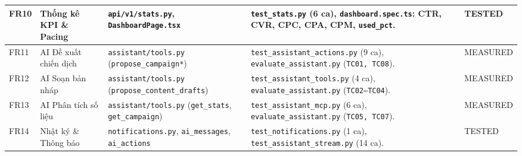 \begin{table}[!htbp]
\begin{tabularx}{\textwidth}{|C{0.9cm}|L{2.5cm}|L{3.5cm}|Y|C{1.9cm}|}
\hline
FR10 & Thống kê KPI \& Pacing & \texttt{api/v1/stats.py}, \texttt{DashboardPage.tsx} & \texttt{test\_stats.py} (6 ca), \texttt{dashboard.spec.ts}: CTR, CVR, CPC, CPA, CPM, \texttt{used\_pct}. & TESTED\\
\hline
FR11 & AI Đề xuất chiến dịch & \texttt{assistant/tools.py} (\texttt{propose\_campaign*}) & \texttt{test\_assistant\_actions.py} (9 ca), \texttt{evaluate\_assistant.py} (\texttt{TC01, TC08}). & MEASURED\\
\hline
FR12 & AI Soạn bản nháp & \texttt{assistant/tools.py} (\texttt{propose\_content\_drafts}) & \texttt{test\_assistant\_tools.py} (4 ca), \texttt{evaluate\_assistant.py} (\texttt{TC02--TC04}). & MEASURED\\
\hline
FR13 & AI Phân tích số liệu & \texttt{assistant/tools.py} (\texttt{get\_stats}, \texttt{get\_campaign}) & \texttt{test\_assistant\_mcp.py} (6 ca), \texttt{evaluate\_assistant.py} (\texttt{TC05, TC07}). & MEASURED\\
\hline
FR14 & Nhật ký \& Thông báo & \texttt{notifications.py}, \texttt{ai\_messages}, \texttt{ai\_actions} & \texttt{test\_notifications.py} (1 ca), \texttt{test\_assistant\_stream.py} (14 ca). & TESTED\\
\hline
\end{tabularx}
\end{table}

